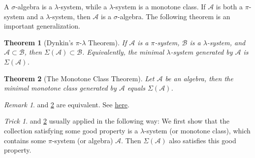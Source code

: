 \documentclass[openany]{book}
\newtheorem{theorem}{Theorem}[chapter]
\theoremstyle{definition}
\theoremstyle{remark}
\newtheorem*{remark}{Remark}
\newtheorem*{trick}{Trick}
\begin{document}
A $\sigma$-algebra is a $\lambda$-system, while a $\lambda$-system is a monotone class. If $\mathcal{A}$ is both a $\pi$-system and a $\lambda$-system, then $\mathcal{A}$ is a $\sigma$-algebra. The following theorem is an important generalization.
\begin{theorem}[Dynkin's $\pi$-$\lambda$ Theorem]\label{thm:piLambda}
    If $\mathcal{A}$ is a $\pi$-system, $\mathcal{B}$ is a $\lambda$-system, and $\mathcal{A}\subset \mathcal{B}$, then $\Sigma(\mathcal{A})\subset \mathcal{B}$. Equivalently, the minimal $\lambda$-system generated by $\mathcal{A}$ is $\Sigma(\mathcal{A})$.
\end{theorem}
\begin{theorem}[The Monotone Class Theorem]\label{thm:monotoneClass}
    Let $\mathcal{A}$ be an algebra, then the minimal monotone class generated by $\mathcal{A}$ equals $\Sigma(\mathcal{A})$.
\end{theorem}
\begin{remark}
     and \ref{thm:monotoneClass} are equivalent. See \href{https://math.stackexchange.com/questions/1841193/monotone-class-theorem-and-another-similar-theorem}{here}.
\end{remark}
\begin{trick}
     and \ref{thm:monotoneClass} usually applied in the following way: We first show that the collection satisfying some good property is a $\lambda$-system (or monotone class), which contains some $\pi$-system (or algebra) $\mathcal{A}$. Then $\Sigma(\mathcal{A})$ also satisfies this good property.
\end{trick}
\end{document}
